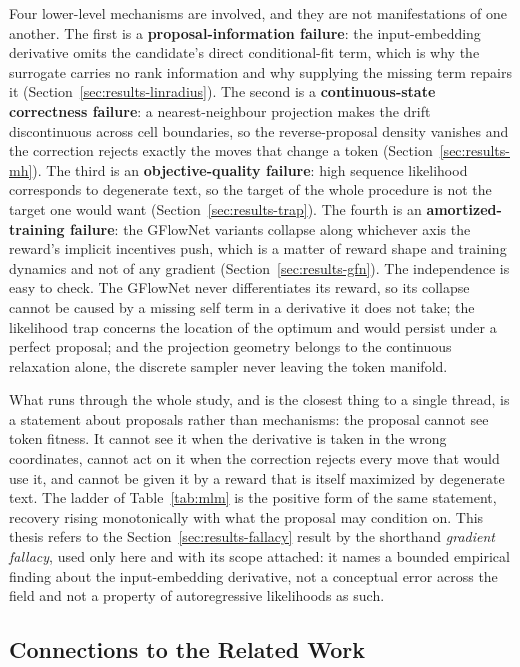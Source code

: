 Four lower-level mechanisms are involved, and they are not manifestations of one another. The first is a \textbf{proposal-information failure}: the input-embedding derivative omits the candidate's direct conditional-fit term, which is why the surrogate carries no rank information and why supplying the missing term repairs it (Section~\ref{sec:results-linradius}). The second is a \textbf{continuous-state correctness failure}: a nearest-neighbour projection makes the drift discontinuous across cell boundaries, so the reverse-proposal density vanishes and the correction rejects exactly the moves that change a token (Section~\ref{sec:results-mh}). The third is an \textbf{objective-quality failure}: high sequence likelihood corresponds to degenerate text, so the target of the whole procedure is not the target one would want (Section~\ref{sec:results-trap}). The fourth is an \textbf{amortized-training failure}: the GFlowNet variants collapse along whichever axis the reward's implicit incentives push, which is a matter of reward shape and training dynamics and not of any gradient (Section~\ref{sec:results-gfn}). The independence is easy to check. The GFlowNet never differentiates its reward, so its collapse cannot be caused by a missing self term in a derivative it does not take; the likelihood trap concerns the location of the optimum and would persist under a perfect proposal; and the projection geometry belongs to the continuous relaxation alone, the discrete sampler never leaving the token manifold.

What runs through the whole study, and is the closest thing to a single thread, is a statement about proposals rather than mechanisms: the proposal cannot see token fitness. It cannot see it when the derivative is taken in the wrong coordinates, cannot act on it when the correction rejects every move that would use it, and cannot be given it by a reward that is itself maximized by degenerate text. The ladder of Table~\ref{tab:mlm} is the positive form of the same statement, recovery rising monotonically with what the proposal may condition on. This thesis refers to the Section~\ref{sec:results-fallacy} result by the shorthand \emph{gradient fallacy}, used only here and with its scope attached: it names a bounded empirical finding about the input-embedding derivative, not a conceptual error across the field and not a property of autoregressive likelihoods as such.

\subsection{Connections to the Related Work}
\label{sec:disc-related}

